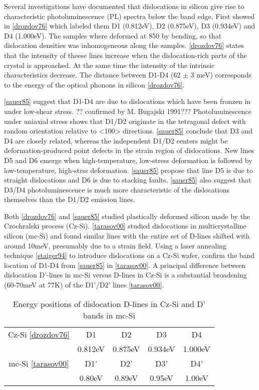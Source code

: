 Several investigations have documented that dislocations in silicon give rise to characteristic photoluminescence (PL) spectra below the band edge. First showed in \ref{drozdov76} which labeled them D1 (0.812eV), D2 (0.875eV), D3 (0.934eV) and D4 (1.000eV). The samples where deformed at 850 \degrees by bending, so that dislocation densities was inhomogeneous along the samples. \ref{drozdov76} states that the intensity of theese lines increase when the dislocation-rich parts of the crystal is approached. At the same time the intensity of the intrinsic characteristics decrease. The distance between D1-D4 (62 $\pm$ 3 meV) corresponds to the energy of the optical phonons in silicon \ref{drozdov76}.

\ref{sauer85} suggest that D1-D4 are due to dislocations which have been fronzen in under low-shear stress. ?? confirmed by M. Bugajski 1991??? Photoluminescence under uniaxial stress shows that D1/D2 originate in the tetragonal defect with random orientation relative to <100> directions. \ref{sauer85} conclude that D3 and D4 are closely related, whereas the independent D1/D2 centers might be deformation-produced point defects in the strain region of dislocations. New lines D5 and D6 emerge when high-temperature, low-stress deformation is followed by low-temperature, high-strss deformation. \ref{sauer85} propose that line D5 is due to straight dislocations and D6 is due to stacking faults. \ref{sauer85} also suggest that D3/D4 photoluminescence is much more characteristic of the dislocations themselves than the D1/D2 emission lines.

Both \ref{drozdov76} and \ref{sauer85} studied plastically deformed silicon made by the Czochralski process (Cz-Si). \ref{tarasov00} studied  dislocations in multicrystalline silicon (mc-Si) and found similar lines with the entire set of D-lines shifted with around 10meV, presumably due to a strain field. Using a laser annealing technique \ref{staiger94} to introduce dislocations on a Cz-Si wafer, confirm the band location of D1-D4 from \ref{sauer85} in \ref{tarasov00}. A principal difference between dislocation D'-lines in mc-Si versus D-lines in Cz-Si is a substantial broadening (60-70meV at 77K) of the D1'/D2' lines \ref{tarasov00}.


\begin{table}[H]
\centering
\begin{tabular}{|c|c|c|c|c|}
\hline
Cz-Si \ref{drozdov76} & D1 & D2 & D3 & D4 \\
	& 0.812eV & 0.875eV & 0.934eV & 1.000eV \\
\hline
mc-Si \ref{tarasov00} & D1' & D2' & D3' & D4' \\
		& 0.80eV & 0.89eV & 0.95eV & 1.00eV \\
\hline
\end{tabular}
\caption{Energy positions of dislocation D-lines in Cz-Si and D' bands in mc-Si}
\label{}
\end{table}


